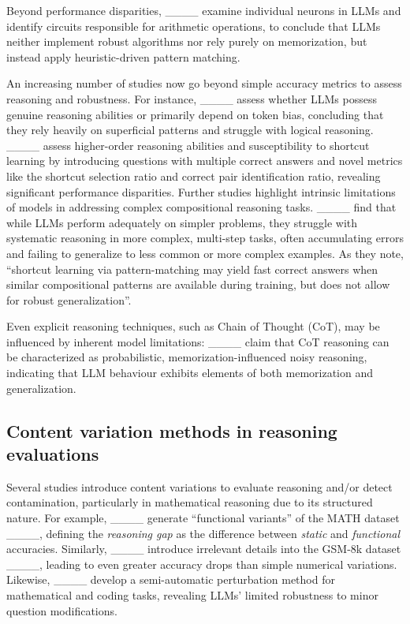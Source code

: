 Beyond performance disparities, ____ examine individual neurons in LLMs and identify circuits responsible for arithmetic operations, to conclude that LLMs neither implement robust algorithms nor rely purely on memorization, but instead apply heuristic-driven pattern matching. 

An increasing number of studies now go beyond simple accuracy metrics to assess reasoning and robustness. For instance, ____ assess whether LLMs possess genuine reasoning abilities or primarily depend on token bias, concluding that they rely heavily on superficial patterns and struggle with logical reasoning. ____ assess higher-order reasoning abilities and susceptibility to shortcut learning by introducing questions with multiple correct answers and novel metrics like the shortcut selection ratio and correct pair identification ratio, revealing significant performance disparities. Further studies highlight intrinsic limitations of models in addressing complex compositional reasoning tasks. ____ find that while LLMs perform adequately on simpler problems, they struggle with systematic reasoning in more complex, multi-step tasks, often accumulating errors and failing to generalize to less common or more complex examples. As they note, ``shortcut learning via pattern-matching may yield fast correct answers when similar compositional patterns are available during training, but does not allow for robust generalization''. 

Even explicit reasoning techniques, such as Chain of Thought (CoT), may be influenced by inherent model limitations: ____ claim that CoT reasoning can be characterized as probabilistic, memorization-influenced noisy reasoning, indicating that LLM behaviour exhibits elements of both memorization and generalization.

\subsection{Content variation methods in reasoning evaluations}

Several studies introduce content variations to evaluate reasoning and/or detect contamination, particularly in mathematical reasoning due to its structured nature. For example, ____ generate ``functional variants'' of the MATH dataset ____, defining the \textit{reasoning gap} as the difference between \textit{static} and \textit{functional} accuracies. Similarly, ____ introduce irrelevant details into the GSM-8k dataset ____, leading to even greater accuracy drops than simple numerical variations. Likewise, ____ develop a semi-automatic perturbation method for mathematical and coding tasks, revealing LLMs' limited robustness to minor question modifications.

